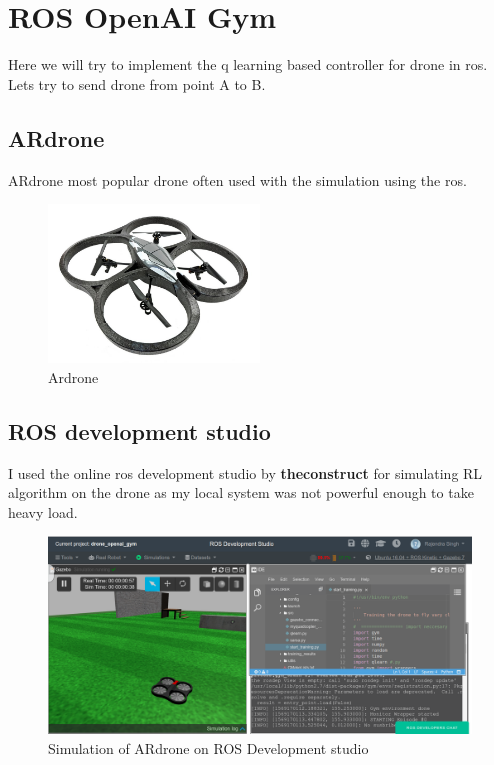\chapter{ROS OpenAI Gym}

Here we will try to implement the q learning based controller for drone in ros. Lets try to send drone from point A to B.


\section{ARdrone}
ARdrone most popular drone often used with the simulation using the ros.
\begin{figure}
    \centering
    \includegraphics[width=0.5\textwidth]{images/ardrone.jpg}
    \caption{Ardrone}
\end{figure}
\section{ROS development studio}
I used the online ros development studio by \textbf{theconstruct} for simulating RL algorithm on the drone as my local system was not powerful enough to take heavy load.

\begin{figure}
    \centering
    \includegraphics[width=\textwidth]{images/rds.png}
    \caption{Simulation of ARdrone on ROS Development studio}
\end{figure}
